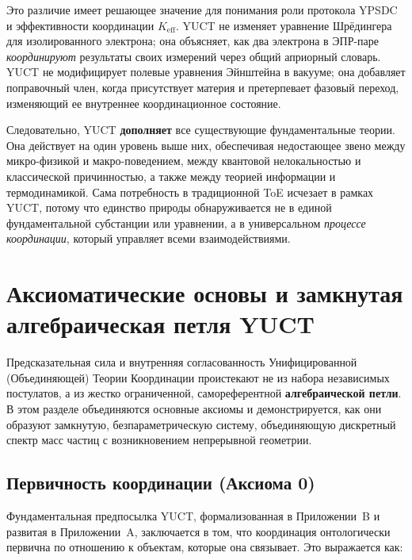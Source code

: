\documentclass[11pt,a4paper]{article}
\begin{document}
	Это различие имеет решающее значение для понимания роли протокола YPSDC и эффективности координации \(K_{\mathrm{eff}}\). YUCT не изменяет уравнение Шрёдингера для изолированного электрона; она объясняет, как два электрона в ЭПР-паре \emph{координируют} результаты своих измерений через общий априорный словарь. YUCT не модифицирует полевые уравнения Эйнштейна в вакууме; она добавляет поправочный член, когда присутствует материя и претерпевает фазовый переход, изменяющий ее внутреннее координационное состояние.
	
	Следовательно, YUCT \textbf{дополняет} все существующие фундаментальные теории. Она действует на один уровень выше них, обеспечивая недостающее звено между микро-физикой и макро-поведением, между квантовой нелокальностью и классической причинностью, а также между теорией информации и термодинамикой. Сама потребность в традиционной ToE исчезает в рамках YUCT, потому что единство природы обнаруживается не в единой фундаментальной субстанции или уравнении, а в универсальном \emph{процессе координации}, который управляет всеми взаимодействиями.
	
	
	\section{Аксиоматические основы и замкнутая алгебраическая петля YUCT}
	\label{sec:axiomatic-foundations}
	
	Предсказательная сила и внутренняя согласованность Унифицированной (Объединяющей) Теории Координации проистекают не из набора независимых постулатов, а из жестко ограниченной, самореферентной \textbf{алгебраической петли}. В этом разделе объединяются основные аксиомы и демонстрируется, как они образуют замкнутую, безпараметрическую систему, объединяющую дискретный спектр масс частиц с возникновением непрерывной геометрии.
	
	\subsection{Первичность координации (Аксиома 0)}
	\label{subsec:axiom0}
	
	Фундаментальная предпосылка YUCT, формализованная в Приложении~B и развитая в Приложении~A, заключается в том, что координация онтологически первична по отношению к объектам, которые она связывает. Это выражается как:
	
\end{document}

